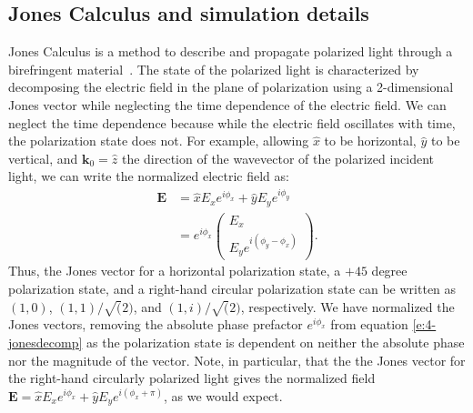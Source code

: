 \subsection{Jones Calculus and simulation details}
Jones Calculus is a method to describe and propagate polarized light through a birefringent material~\cite{RN232}.
The state of the polarized light is characterized by decomposing the electric field in the plane of polarization using a 2-dimensional Jones vector while neglecting the time dependence of the electric field.
We can neglect the time dependence because while the electric field oscillates with time, the polarization state does not.
For example, allowing $\hat{x}$ to be horizontal, $\hat{y}$ to be vertical, and $\mathbf{k}_0 = \hat{z}$ the direction of the wavevector of the polarized incident light, we can write the normalized electric field as:
\begin{align}
\mathbf{E} &=  \hat{x}E_x e^{i \phi _x} + \hat{y} E_y e^{i \phi _y}\\  &= e^{i \phi _x} \left( \begin{array}{c} E_x \\E_y e^{i(\phi _y - \phi _x)}      \end{array} \right). \label{e:4-jonesdecomp}
\end{align}
Thus, the Jones vector for a horizontal polarization state, a $+45$ degree polarization state, and a right-hand circular polarization state can be written as $(1,0)$, $(1,1)/\sqrt(2)$, and $(1,i)/\sqrt(2)$, respectively.
We have normalized the Jones vectors, removing the absolute phase prefactor $e^{i \phi _x}$ from equation \ref{e:4-jonesdecomp} as the polarization state is dependent on neither the absolute phase nor the magnitude of the vector.
Note, in particular, that the the Jones vector for the right-hand circularly polarized light gives the normalized field $\mathbf{E} = \hat{x}E_x e^{i \phi _x} + \hat{y} E_y e^{i( \phi _x+\pi)}$, as we would expect.

